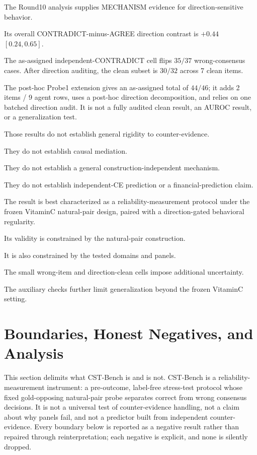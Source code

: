 \documentclass[11pt]{article}
\begin{document}
The Round10 analysis supplies MECHANISM evidence for direction-sensitive behavior.

Its overall CONTRADICT-minus-AGREE direction contrast is \(+0.44\) \([0.24,0.65]\).

The as-assigned independent-CONTRADICT cell flips \(35/37\) wrong-consensus cases. After direction auditing, the clean subset is \(30/32\) across 7 clean items.

The post-hoc Probe1 extension gives an as-assigned total of \(44/46\); it adds 2 items / 9 agent rows, uses a post-hoc direction decomposition, and relies on one batched direction audit. It is not a fully audited clean result, an AUROC result, or a generalization test.

Those results do not establish general rigidity to counter-evidence.

They do not establish causal mediation.

They do not establish a general construction-independent mechanism.

They do not establish independent-CE prediction or a financial-prediction claim.

The result is best characterized as a reliability-measurement protocol under the frozen VitaminC natural-pair design, paired with a direction-gated behavioral regularity.

Its validity is constrained by the natural-pair construction.

It is also constrained by the tested domains and panels.

The small wrong-item and direction-clean cells impose additional uncertainty.

The auxiliary checks further limit generalization beyond the frozen VitaminC setting.

\section{Boundaries, Honest Negatives, and Analysis}

This section delimits what CST-Bench is and is not. CST-Bench is a reliability-measurement instrument: a pre-outcome, label-free stress-test protocol whose fixed gold-opposing natural-pair probe separates correct from wrong consensus decisions. It is not a universal test of counter-evidence handling, not a claim about why panels fail, and not a predictor built from independent counter-evidence. Every boundary below is reported as a negative result rather than repaired through reinterpretation; each negative is explicit, and none is silently dropped.
\end{document}

